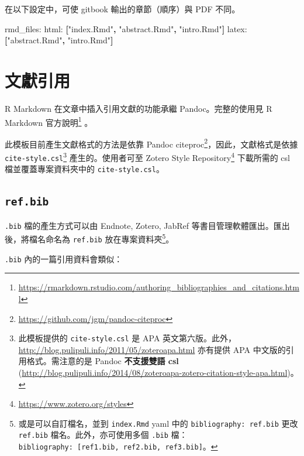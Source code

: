 \documentclass[oneside]{book}
\newenvironment{Shaded}{\begin{snugshade}}{\end{snugshade}}
\newcommand{\AttributeTok}[1]{\textcolor[rgb]{0.77,0.63,0.00}{#1}}
\newcommand{\FunctionTok}[1]{\textcolor[rgb]{0.00,0.00,0.00}{#1}}
\newcommand{\KeywordTok}[1]{\textcolor[rgb]{0.13,0.29,0.53}{\textbf{#1}}}
\newcommand{\StringTok}[1]{\textcolor[rgb]{0.31,0.60,0.02}{#1}}
\renewcommand{\href}[2]{#2\footnote{\url{#1}}}
\theoremstyle{definition}
\theoremstyle{definition}
\theoremstyle{definition}
\theoremstyle{remark}
\begin{document}
在以下設定中，可使 gitbook 輸出的章節（順序）與 PDF 不同。

\begin{Shaded}
\begin{Highlighting}[]
\FunctionTok{rmd_files:}
  \FunctionTok{html:}\AttributeTok{ }\KeywordTok{[}\StringTok{"index.Rmd"}\KeywordTok{,} \StringTok{"abstract.Rmd"}\KeywordTok{,} \StringTok{"intro.Rmd"}\KeywordTok{]}
  \FunctionTok{latex:}\AttributeTok{ }\KeywordTok{[}\StringTok{"abstract.Rmd"}\KeywordTok{,} \StringTok{"intro.Rmd"}\KeywordTok{]}
\end{Highlighting}
\end{Shaded}

\hypertarget{bib-cite}{%
\section{文獻引用}\label{bib-cite}}

R Markdown 在文章中插入引用文獻的功能承繼 Pandoc。完整的使用見 \href{https://rmarkdown.rstudio.com/authoring_bibliographies_and_citations.html}{R Markdown 官方說明} 。

此模板目前產生文獻格式的方法是依靠 \href{https://github.com/jgm/pandoc-citeproc}{Pandoc citeproc}，因此，文獻格式是依據 \texttt{cite-style.csl}\footnote{此模板提供的 \texttt{cite-style.csl} 是 APA 英文第六版。此外，\url{http://blog.pulipuli.info/2011/05/zoteroapa.html} 亦有提供 APA 中文版的引用格式。需注意的是 Pandoc \textbf{不支援雙語 csl} (\url{http://blog.pulipuli.info/2014/08/zoteroapa-zotero-citation-style-apa.html})。} 產生的。使用者可至 \href{https://www.zotero.org/styles}{Zotero Style Repository} 下載所需的 csl 檔並覆蓋專案資料夾中的 \texttt{cite-style.csl}。

\hypertarget{ref-bib}{%
\subsection{\texorpdfstring{\texttt{ref.bib}}{ref.bib}}\label{ref-bib}}

\texttt{.bib} 檔的產生方式可以由 Endnote, Zotero, JabRef 等書目管理軟體匯出。匯出後，將檔名命名為 \texttt{ref.bib} 放在專案資料夾\footnote{或是可以自訂檔名，並到 \texttt{index.Rmd} yaml 中的 \texttt{bibliography:\ ref.bib} 更改 \texttt{ref.bib} 檔名。此外，亦可使用多個 \texttt{.bib} 檔：\texttt{bibliography:\ {[}ref1.bib,\ ref2.bib,\ ref3.bib{]}}。}。

\texttt{.bib} 內的一篇引用資料會類似：
\end{document}
